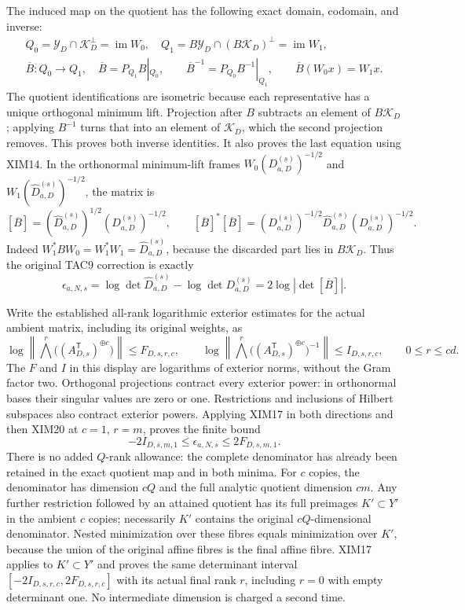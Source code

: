 \documentclass[11pt,a4paper]{article}
\begin{document}
The induced map on the quotient has the following exact domain,
codomain, and inverse:
\[
\begin{gathered}
 Q_0=\mathscr Y_D\cap\mathscr K_D^\perp=\operatorname{im}W_0,
 \quad Q_1=B\mathscr Y_D\cap(B\mathscr K_D)^\perp
                         =\operatorname{im}W_1,\\
 \overline B:Q_0\longrightarrow Q_1,
       \quad \overline B=P_{Q_1}B|_{Q_0},\qquad
 \overline B^{-1}=P_{Q_0}B^{-1}|_{Q_1},\qquad
 \overline B(W_0x)=W_1x.
\end{gathered}\tag{XIM17}
\]
The quotient identifications are isometric because each representative
has a unique orthogonal minimum lift. Projection after $B$ subtracts
an element of $B\mathscr K_D$; applying $B^{-1}$ turns that into an
element of $\mathscr K_D$, which the second projection removes.
This proves both inverse identities. It also proves the last equation
using XIM14. In the orthonormal minimum-lift frames
$W_0(D_{a,D}^{(s)})^{-1/2}$ and
$W_1(\widehat D_{a,D}^{(s)})^{-1/2}$, the matrix is
\[
 [\overline B]=
 (\widehat D_{a,D}^{(s)})^{1/2}(D_{a,D}^{(s)})^{-1/2},\qquad
 [\overline B]^*[\overline B]=
 (D_{a,D}^{(s)})^{-1/2}\widehat D_{a,D}^{(s)}(D_{a,D}^{(s)})^{-1/2}.
 \tag{XIM18}
\]
Indeed $W_1^*BW_0=W_1^*W_1=\widehat D_{a,D}^{(s)}$, because
the discarded part lies in $B\mathscr K_D$. Thus the original TAC9
correction is exactly
\[
 \epsilon_{a,N,s}
 =\log\det\widehat D_{a,D}^{(s)}-\log\det D_{a,D}^{(s)}
 =2\log|\det[\overline B]|.
 \tag{XIM19}
\]

Write the established all-rank logarithmic exterior estimates for the
actual ambient matrix, including its original weights, as
\[
 \log\left\|\bigwedge^r\bigl((A_{D,s}^{\mathsf T})^{\oplus c}\bigr)\right\|
       \le F_{D,s,r,c},\qquad
 \log\left\|\bigwedge^r\big((A_{D,s}^{\mathsf T})^{\oplus c}\big)^{-1}
       \right\|\le I_{D,s,r,c},\qquad 0\le r\le cd.
 \tag{XIM20}
\]
The $F$ and $I$ in this display are logarithms of exterior norms,
without the Gram factor two. Orthogonal projections contract every
exterior power: in orthonormal bases their singular values are zero
or one. Restrictions and inclusions of Hilbert subspaces also
contract exterior powers. Applying XIM17 in both directions and
then XIM20 at $c=1$, $r=m$, proves the finite bound
\[
 \boxed{-2I_{D,s,m,1}\le\epsilon_{a,N,s}\le2F_{D,s,m,1}.}
 \tag{XIM21}
\]
There is no added $Q$-rank allowance: the complete denominator has
already been retained in the exact quotient map and in both minima.
For $c$ copies, the denominator has dimension $cQ$ and the full
analytic quotient dimension $cm$. Any further restriction followed
by an attained quotient has its full preimages $K'\subset Y'$ in
the ambient $c$ copies; necessarily $K'$ contains the original
$cQ$-dimensional denominator. Nested minimization over these fibres
equals minimization over $K'$, because the union of the original
affine fibres is the final affine fibre. XIM17 applies to $K'\subset Y'$
and proves the same determinant interval $[-2I_{D,s,r,c},2F_{D,s,r,c}]$
with its actual final rank $r$, including $r=0$ with empty determinant
one. No intermediate dimension is charged a second time.
\end{document}
